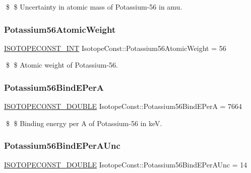 \$ \$ Uncertainty in atomic mass of Potassium-\/56 in amu. \mbox{\label{group___isotope_const-_potassium-_k56_gaaba8342e7a3a6be5698e773a4ca26858}} 
\subsubsection{\texorpdfstring{Potassium56\+Atomic\+Weight}{Potassium56AtomicWeight}}
{\footnotesize\ttfamily \mbox{\hyperlink{group___isotope_const-_macros_ga5f18360b3e99483a35c32d789e62621c}{I\+S\+O\+T\+O\+P\+E\+C\+O\+N\+S\+T\+\_\+\+I\+NT}} Isotope\+Const\+::\+Potassium56\+Atomic\+Weight = 56}

\$ \$ Atomic weight of Potassium-\/56. \mbox{\label{group___isotope_const-_potassium-_k56_ga3dff93dc18dbcd78b9450b0fbad67693}} 
\subsubsection{\texorpdfstring{Potassium56\+Bind\+E\+PerA}{Potassium56BindEPerA}}
{\footnotesize\ttfamily \mbox{\hyperlink{group___isotope_const-_macros_ga8f45a7272ce02c0b4c65c44636ed719a}{I\+S\+O\+T\+O\+P\+E\+C\+O\+N\+S\+T\+\_\+\+D\+O\+U\+B\+LE}} Isotope\+Const\+::\+Potassium56\+Bind\+E\+PerA = 7664}

\$ \$ Binding energy per A of Potassium-\/56 in keV. \mbox{\label{group___isotope_const-_potassium-_k56_ga6694a52b8d992be217bcbbc4bee6b3d6}} 
\subsubsection{\texorpdfstring{Potassium56\+Bind\+E\+Per\+A\+Unc}{Potassium56BindEPerAUnc}}
{\footnotesize\ttfamily \mbox{\hyperlink{group___isotope_const-_macros_ga8f45a7272ce02c0b4c65c44636ed719a}{I\+S\+O\+T\+O\+P\+E\+C\+O\+N\+S\+T\+\_\+\+D\+O\+U\+B\+LE}} Isotope\+Const\+::\+Potassium56\+Bind\+E\+Per\+A\+Unc = 14}

